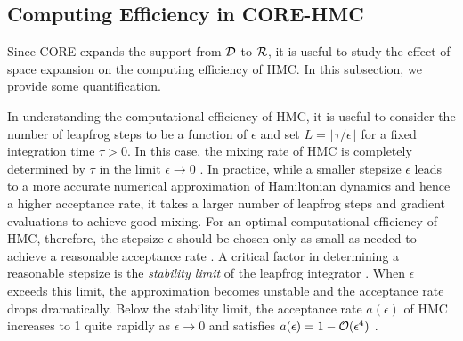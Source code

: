 \documentclass[10pt,fleqn]{article}
\DeclareMathOperator{\1}{\mathbbm{1}} \DeclareMathOperator{\bigO}{\mc O}
\newcommand{\dt}{\epsilon} %
\begin{document}
\subsection{Computing Efficiency in CORE-HMC}

Since CORE expands the support from $\mathcal{D}$ to $\mathcal{R}$, it is useful to
study the effect of space expansion on the computing efficiency of HMC. In this
subsection, we provide some quantification.

In understanding the computational efficiency of HMC, it is useful to
consider the number of leapfrog steps to be a function of $\dt$ and set $L
= \lfloor \tau / \dt \rfloor$ for a fixed integration time $\tau > 0$. In
this case, the mixing rate of HMC is completely determined by $\tau$ in the
limit $\dt \to 0$ \citep{betancourt17}. In practice, while a smaller
stepsize $\dt$ leads to a more accurate numerical approximation of
Hamiltonian dynamics and hence a higher acceptance rate, it takes a larger
number of leapfrog steps and gradient evaluations to achieve good mixing.
For an optimal computational efficiency of HMC, therefore, the stepsize
$\dt$ should be chosen only as small as needed to achieve a reasonable
acceptance rate \citep{beskos13, betancourt14}. A critical factor in
determining a reasonable stepsize is the \textit{stability limit} of the
leapfrog integrator \citep{neal2011mcmc}. When $\dt$ exceeds this limit,
the approximation becomes unstable and the acceptance rate drops
dramatically. Below the stability limit, the acceptance rate $a(\dt)$ of
HMC increases to 1 quite rapidly as $\dt \to 0$ and satisfies
$a(\dt) = 1 - \mc O(\dt^4)$ \citep{beskos13}.
\end{document}
